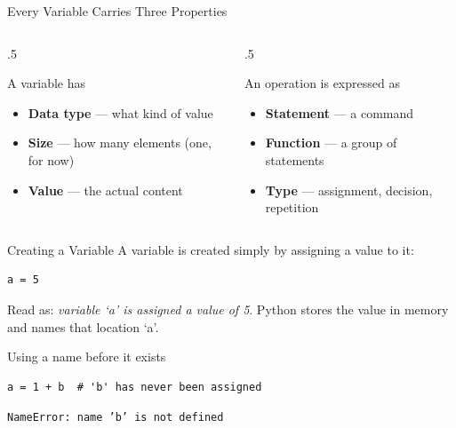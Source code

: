 \documentclass[9pt,aspectratio=169,xcolor=table]{beamer}
\begin{document}
\begin{frame}{Every Variable Carries Three Properties}
    \leavevmode
    \begin{columns}[t]
        \begin{column}{.5\textwidth}
            \begin{block}{A variable has}
                \small
                \begin{itemize}
                    \item \textbf{Data type} --- what kind of value
                    \item \textbf{Size} --- how many elements (one, for now)
                    \item \textbf{Value} --- the actual content
                \end{itemize}
            \end{block}
        \end{column}
        \begin{column}{.5\textwidth}
            \begin{block}{An operation is expressed as}
                \small
                \begin{itemize}
                    \item \textbf{Statement} --- a command
                    \item \textbf{Function} --- a group of statements
                    \item \textbf{Type} --- assignment, decision, repetition
                \end{itemize}
            \end{block}
        \end{column}
    \end{columns}
\end{frame}

\begin{frame}[fragile]{Creating a Variable}
    \leavevmode
    A variable is created simply by \alert{assigning} a value to it:

\begin{lstlisting}
a = 5
\end{lstlisting}

    \vspace{1mm}
    Read as: \emph{variable `a' is assigned a value of 5}. Python stores
    the value in memory and names that location `a'.

    \vspace{3mm}
    \begin{alertblock}{Using a name before it exists}
\begin{lstlisting}
a = 1 + b  # 'b' has never been assigned
\end{lstlisting}
        \texttt{NameError: name 'b' is not defined}
    \end{alertblock}
\end{frame}
\end{document}
